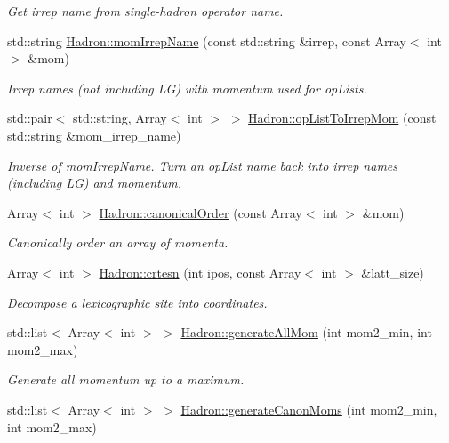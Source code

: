 \begin{DoxyCompactItemize}
\begin{DoxyCompactList}\small\item\em Get irrep name from single-\/hadron operator name. \end{DoxyCompactList}\item 
std\+::string \mbox{\hyperlink{namespaceHadron_a5c4cac841f1c5a1f144e6c98360d8a4d}{Hadron\+::mom\+Irrep\+Name}} (const std\+::string \&irrep, const Array$<$ int $>$ \&mom)
\begin{DoxyCompactList}\small\item\em Irrep names (not including LG) with momentum used for op\+Lists. \end{DoxyCompactList}\item 
std\+::pair$<$ std\+::string, Array$<$ int $>$ $>$ \mbox{\hyperlink{namespaceHadron_a8bd515c92e3dbbe8e9741b25d71edc60}{Hadron\+::op\+List\+To\+Irrep\+Mom}} (const std\+::string \&mom\+\_\+irrep\+\_\+name)
\begin{DoxyCompactList}\small\item\em Inverse of mom\+Irrep\+Name. Turn an op\+List name back into irrep names (including LG) and momentum. \end{DoxyCompactList}\item 
Array$<$ int $>$ \mbox{\hyperlink{namespaceHadron_a12bd76a337723c31527ee95d46f170d1}{Hadron\+::canonical\+Order}} (const Array$<$ int $>$ \&mom)
\begin{DoxyCompactList}\small\item\em Canonically order an array of momenta. \end{DoxyCompactList}\item 
Array$<$ int $>$ \mbox{\hyperlink{namespaceHadron_a10fe1c3c465ac8dd8b6edab007aa6ab7}{Hadron\+::crtesn}} (int ipos, const Array$<$ int $>$ \&latt\+\_\+size)
\begin{DoxyCompactList}\small\item\em Decompose a lexicographic site into coordinates. \end{DoxyCompactList}\item 
std\+::list$<$ Array$<$ int $>$ $>$ \mbox{\hyperlink{namespaceHadron_aa0ad60c011c7668c5389ce9286b3c8dd}{Hadron\+::generate\+All\+Mom}} (int mom2\+\_\+min, int mom2\+\_\+max)
\begin{DoxyCompactList}\small\item\em Generate all momentum up to a maximum. \end{DoxyCompactList}\item 
std\+::list$<$ Array$<$ int $>$ $>$ \mbox{\hyperlink{namespaceHadron_af42e0a1c54e10b67abac83c56c67b40e}{Hadron\+::generate\+Canon\+Moms}} (int mom2\+\_\+min, int mom2\+\_\+max)

\end{DoxyCompactItemize}
